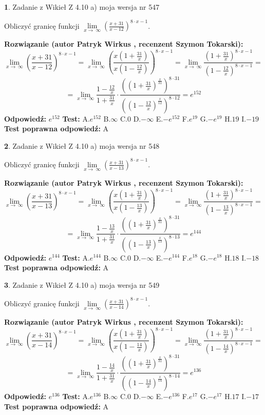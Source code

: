 \documentclass[12pt, a4paper]{article}
\theoremstyle{definition} %
\newtheorem{zad}{}
\newcommand{\zadStart}[1]{\begin{zad}#1\newline}
\newcommand{\zadStop}{\end{zad}}
\newcommand{\rozwStart}[2]{\noindent \textbf{Rozwiązanie (autor #1 , recenzent #2): }\newline}
\newcommand{\rozwStop}{\newline}
\newcommand{\odpStart}{\noindent \textbf{Odpowiedź:}\newline}
\newcommand{\odpStop}{\newline}
\newcommand{\testStart}{\noindent \textbf{Test:}\newline}
\newcommand{\testStop}{\newline}
\newcommand{\kluczStart}{\noindent \textbf{Test poprawna odpowiedź:}\newline}
\newcommand{\kluczStop}{\newline}
\begin{document}
\zadStart{Zadanie z Wikieł Z 4.10 a) moja wersja nr 547}

Obliczyć granicę funkcji  $\lim\limits_{x\to\ \infty}(\frac{x+31}{x-12})^{8\cdot x-1}$.
\zadStop
\rozwStart{Patryk Wirkus}{Szymon Tokarski}
$$\lim\limits_{x\to\ \infty}(\frac{x+31}{x-12})^{8\cdot x-1} = \lim\limits_{x\to\ \infty}(\frac{x(1+\frac{31}{x})}{x(1-\frac{12}{x})})^{8\cdot x-1}=\lim\limits_{x\to\ \infty}\frac{(1+\frac{31}{x})^{8\cdot x-1}}{(1-\frac{12}{x})^{8\cdot x-1}}=$$
$$=\lim\limits_{x\to\ \infty}\frac{1-\frac{12}{x}}{1+\frac{31}{x}}\cdot\frac{((1+\frac{31}{x})^{\frac{x}{31}})^{8\cdot31}}{((1-\frac{12}{x})^{\frac{x}{12}})^{8\cdot12}}=e^{152}$$
\rozwStop
\odpStart
$e^{152}$
\odpStop
\testStart
A.$e^{152}$ B.$\infty$ C.$0$ D.$-\infty$ E.$-e^{152}$
F.$e^{19}$ G.$-e^{19}$
H.$19$
I.$-19$
\testStop
\kluczStart
A
\kluczStop



\zadStart{Zadanie z Wikieł Z 4.10 a) moja wersja nr 548}

Obliczyć granicę funkcji  $\lim\limits_{x\to\ \infty}(\frac{x+31}{x-13})^{8\cdot x-1}$.
\zadStop
\rozwStart{Patryk Wirkus}{Szymon Tokarski}
$$\lim\limits_{x\to\ \infty}(\frac{x+31}{x-13})^{8\cdot x-1} = \lim\limits_{x\to\ \infty}(\frac{x(1+\frac{31}{x})}{x(1-\frac{13}{x})})^{8\cdot x-1}=\lim\limits_{x\to\ \infty}\frac{(1+\frac{31}{x})^{8\cdot x-1}}{(1-\frac{13}{x})^{8\cdot x-1}}=$$
$$=\lim\limits_{x\to\ \infty}\frac{1-\frac{13}{x}}{1+\frac{31}{x}}\cdot\frac{((1+\frac{31}{x})^{\frac{x}{31}})^{8\cdot31}}{((1-\frac{13}{x})^{\frac{x}{13}})^{8\cdot13}}=e^{144}$$
\rozwStop
\odpStart
$e^{144}$
\odpStop
\testStart
A.$e^{144}$ B.$\infty$ C.$0$ D.$-\infty$ E.$-e^{144}$
F.$e^{18}$ G.$-e^{18}$
H.$18$
I.$-18$
\testStop
\kluczStart
A
\kluczStop



\zadStart{Zadanie z Wikieł Z 4.10 a) moja wersja nr 549}

Obliczyć granicę funkcji  $\lim\limits_{x\to\ \infty}(\frac{x+31}{x-14})^{8\cdot x-1}$.
\zadStop
\rozwStart{Patryk Wirkus}{Szymon Tokarski}
$$\lim\limits_{x\to\ \infty}(\frac{x+31}{x-14})^{8\cdot x-1} = \lim\limits_{x\to\ \infty}(\frac{x(1+\frac{31}{x})}{x(1-\frac{14}{x})})^{8\cdot x-1}=\lim\limits_{x\to\ \infty}\frac{(1+\frac{31}{x})^{8\cdot x-1}}{(1-\frac{14}{x})^{8\cdot x-1}}=$$
$$=\lim\limits_{x\to\ \infty}\frac{1-\frac{14}{x}}{1+\frac{31}{x}}\cdot\frac{((1+\frac{31}{x})^{\frac{x}{31}})^{8\cdot31}}{((1-\frac{14}{x})^{\frac{x}{14}})^{8\cdot14}}=e^{136}$$
\rozwStop
\odpStart
$e^{136}$
\odpStop
\testStart
A.$e^{136}$ B.$\infty$ C.$0$ D.$-\infty$ E.$-e^{136}$
F.$e^{17}$ G.$-e^{17}$
H.$17$
I.$-17$
\testStop
\kluczStart
A
\kluczStop
\end{document}
